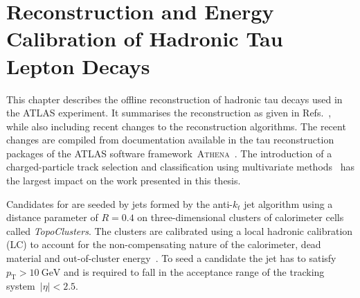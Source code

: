 \chapter{Reconstruction and Energy Calibration of Hadronic Tau Lepton Decays}
\label{sec:reconstruction}

%
%
This chapter describes the offline reconstruction of hadronic tau decays used in
the ATLAS experiment. It summarises the reconstruction as given in Refs.\
\cite{atlas:taurec:run1, atlas:taurec:run2}, while also including recent changes
to the reconstruction algorithms. The recent changes are compiled from
documentation available in the tau reconstruction packages of the ATLAS software
framework~\textsc{Athena}~\cite{athena}. The introduction of a charged-particle
track selection and classification using multivariate methods~\cite{duschinger}
has the largest impact on the work presented in this thesis.

Candidates for \tauhadvis are seeded by jets formed by the anti-$k_t$ jet
algorithm using a distance parameter of $R = 0.4$ on three-dimensional clusters
of calorimeter cells called \emph{TopoClusters}. The clusters are calibrated
using a local hadronic calibration (LC) to account for the non-compensating
nature of the calorimeter, dead material and out-of-cluster
energy~\cite{local_hadronic_calib}. To seed a \tauhadvis candidate the jet has
to satisfy~$p_\text{T} > \SI{10}{\GeV}$ and is required to fall in the
acceptance range of the tracking system~$|\eta| < \num{2.5}$.

